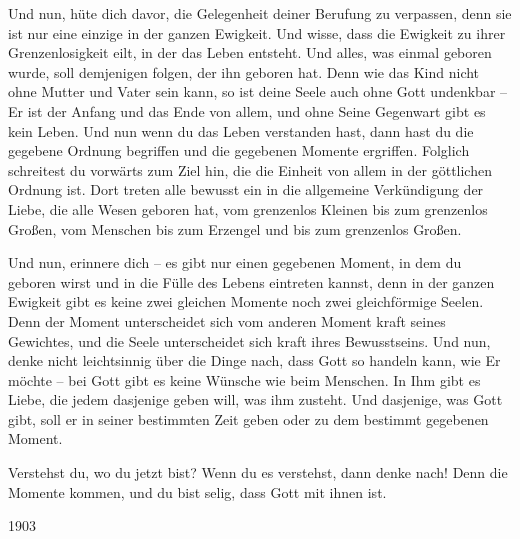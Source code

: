 Und nun, hüte dich davor, die Gelegenheit deiner Berufung zu verpassen, denn sie ist nur eine einzige in der ganzen Ewigkeit. Und wisse, dass die Ewigkeit zu ihrer Grenzenlosigkeit eilt, in der das Leben entsteht. Und alles, was einmal geboren wurde, soll demjenigen folgen, der ihn geboren hat. Denn wie das Kind nicht ohne Mutter und Vater sein kann, so ist deine Seele auch ohne Gott undenkbar -- Er ist der Anfang und das Ende von allem, und ohne Seine Gegenwart gibt es kein Leben. Und nun wenn du das Leben verstanden hast, dann hast du die gegebene Ordnung begriffen und die gegebenen Momente ergriffen. Folglich schreitest du vorwärts zum Ziel hin, die die Einheit von allem in der göttlichen Ordnung ist. Dort treten alle bewusst ein in die allgemeine Verkündigung der Liebe, die alle Wesen geboren hat, vom grenzenlos Kleinen bis zum grenzenlos Großen, vom Menschen bis zum Erzengel und bis zum grenzenlos Großen. 

Und nun, erinnere dich -- es gibt nur einen gegebenen Moment, in dem du geboren wirst und in die Fülle des Lebens eintreten kannst, denn in der ganzen Ewigkeit gibt es keine zwei gleichen Momente noch zwei gleichförmige Seelen. Denn der Moment unterscheidet sich vom anderen Moment kraft seines Gewichtes, und die Seele unterscheidet sich kraft ihres Bewusstseins. Und nun, denke nicht leichtsinnig über die Dinge nach, dass Gott so handeln kann, wie Er möchte -- bei Gott gibt es keine Wünsche wie beim Menschen. In Ihm gibt es Liebe, die jedem dasjenige geben will, was ihm zusteht. Und dasjenige, was Gott gibt, soll er in seiner bestimmten Zeit geben oder zu dem bestimmt gegebenen Moment.

Verstehst du, wo du jetzt bist? Wenn du es verstehst, dann denke nach! Denn die Momente kommen, und du bist selig, dass Gott mit ihnen ist. 

1903

